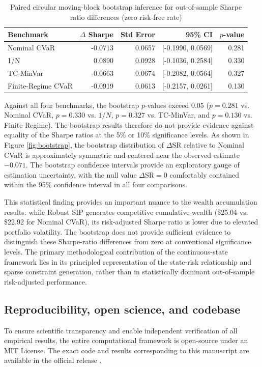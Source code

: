 \documentclass[smallextended]{svjour3}
\begin{document}
\begin{table}[htbp]
\centering
\caption{Paired circular moving-block bootstrap inference for out-of-sample Sharpe ratio differences (zero risk-free rate)}
\label{tab:bootstrap}
\small
\begin{tabular}{lrrrr}
\toprule
\textbf{Benchmark} & \textbf{$\Delta$ Sharpe} & \textbf{Std Error} & \textbf{95\% CI} & \textbf{$p$-value} \\
\midrule
Nominal CVaR & -0.0713 & 0.0657 & [-0.1990, 0.0569] & 0.281 \\
1/N & 0.0890 & 0.0928 & [-0.1036, 0.2584] & 0.330 \\
TC-MinVar & -0.0663 & 0.0674 & [-0.2082, 0.0564] & 0.327 \\
Finite-Regime CVaR & -0.0919 & 0.0613 & [-0.2157, 0.0261] & 0.130 \\
\bottomrule
\end{tabular}
\end{table}

Against all four benchmarks, the bootstrap $p$-values exceed 0.05 ($p = 0.281$ vs. Nominal CVaR, $p = 0.330$ vs. $1/N$, $p = 0.327$ vs. TC-MinVar, and $p = 0.130$ vs. Finite-Regime). The bootstrap results therefore do not provide evidence against equality of the Sharpe ratios at the 5\% or 10\% significance levels. As shown in Figure \ref{fig:bootstrap}, the bootstrap distribution of $\Delta \text{SR}$ relative to Nominal CVaR is approximately symmetric and centered near the observed estimate $-0.071$. The bootstrap confidence intervals provide an exploratory gauge of estimation uncertainty, with the null value $\Delta \text{SR} = 0$ comfortably contained within the 95\% confidence interval in all four comparisons.

This statistical finding provides an important nuance to the wealth accumulation results: while Robust SIP generates competitive cumulative wealth (\$25.04 vs. \$22.92 for Nominal CVaR), its risk-adjusted Sharpe ratio is lower due to elevated portfolio volatility. The bootstrap does not provide sufficient evidence to distinguish these Sharpe-ratio differences from zero at conventional significance levels. The primary methodological contribution of the continuous-state framework lies in its principled representation of the state-risk relationship and sparse constraint generation, rather than in statistically dominant out-of-sample risk-adjusted performance.

\subsection{Reproducibility, open science, and codebase}
To ensure scientific transparency and enable independent verification of all empirical results, the entire computational framework is open-source under an MIT License. The exact code and results corresponding to this manuscript are available in the official release \cite{bezoui2026robust}.
\end{document}
